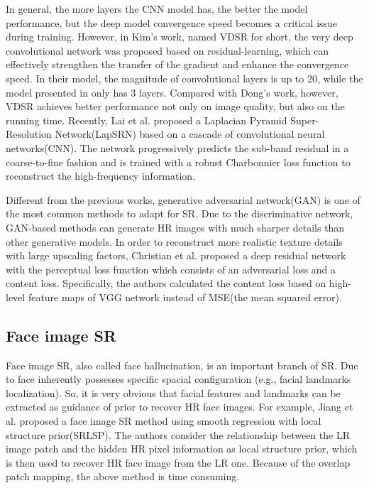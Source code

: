 \documentclass[conference,compsoc]{IEEEtran}
\begin{document}
In general, the more layers the CNN model has, the better the model performance, but the deep model convergence speed becomes a critical issue during training. However, in Kim's work\cite{Kim_2016_DRCN}, named VDSR for short, the very deep convolutional network was proposed based on residual-learning\cite{He2015Deep}, which can effectively strengthen the transfer of the gradient and enhance the convergence speed. In their model, the magnitude of convolutional layers is up to 20, while the model presented in \cite{Dong-He-PAMI2016Image} only has 3 layers. Compared with Dong's work\cite{Dong-He-PAMI2016Image}, however, VDSR achieves better performance not only on image quality, but also on the running time. Recently, Lai et al.\cite{LapSRN_CVPR2017} proposed a Laplacian Pyramid Super-Resolution Network(LapSRN) based on a cascade of convolutional neural networks(CNN). The network progressively predicts the sub-band residual in a coarse-to-fine fashion and is trained with a robust Charbonnier loss function to reconstruct the high-frequency information.

Different from the previous works, generative adversarial network(GAN) is one of the most common methods\cite{David-BEGAN2017, Christian-SRGAN-CVPR2017, Yu-URGAN-ECCV2016, Goodfellow2014GAN} to adapt for SR. Due to the discriminative network, GAN-based methods can generate HR images with much sharper details than other generative models\cite{kingma2013auto, denton2015deep}. In order to reconstruct more realistic texture details with large upscaling factors, Christian et al.\cite{Christian-SRGAN-CVPR2017} proposed a deep residual network with the perceptual loss function which consists of an adversarial loss and a content loss. Specifically, the authors calculated the content loss based on high-level feature maps of VGG network\cite{Simonyan2015Very} instead of MSE(the mean squared error).

\subsection{Face image SR}

Face image SR, also called face hallucination, is an important branch of SR. Due to face inherently possesses specific spacial configuration (e.g., facial landmarks localization). So, it is very obvious that facial features and landmarks can be extracted as guidance of prior to recover HR face images. For example, Jiang et al.\cite{Jiang2016Noise-TCYB, Jiang2016SRLSP} proposed a face image SR method using smooth regression with local structure prior(SRLSP). The authors consider the relationship between the LR image patch and the hidden HR pixel information as local structure prior, which is then used to recover HR face image from the LR one. Because of the overlap patch mapping, the above method is time consuming.
\end{document}
